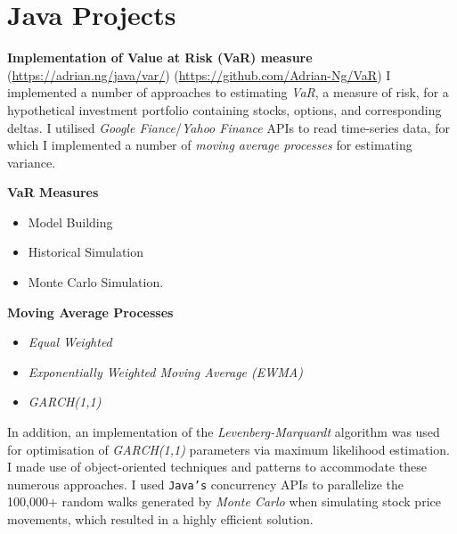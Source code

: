 \documentclass[letterpaper,11pt]{article}
\begin{document}
\section{Java Projects}
\textbf{Implementation of Value at Risk (VaR) measure}
\hfill
\tiny
(\href{https://adrian.ng/java/var/}{https://adrian.ng/java/var/})
\hfill
(\href{https://github.com/Adrian-Ng/VaR}{https://github.com/Adrian-Ng/VaR})
\newline
\small
I implemented a number of approaches to estimating \textit{VaR}, a measure of risk, for a hypothetical investment portfolio containing stocks, options, and corresponding deltas. I utilised \textit{Google Fiance}/\textit{Yahoo Finance} APIs to read time-series data, for which I implemented a number of \textit{moving average processes} for estimating variance.
\begin{multicols}{2}
	\textbf{VaR Measures}
	\begin{itemize}
		\item Model Building
		\item Historical Simulation
		\item Monte Carlo Simulation.
	\end{itemize}
	\columnbreak
	\textbf{Moving Average Processes}
	\begin{itemize}
		\item \textit{Equal Weighted}
		\item \textit{Exponentially Weighted Moving Average (EWMA)}
		\item \textit{GARCH(1,1)}
	\end{itemize}
\end{multicols}
\noindent
In addition, an implementation of the \textit{Levenberg-Marquardt} algorithm was used for optimisation of \textit{GARCH(1,1)} parameters via maximum likelihood estimation.
I made use of object-oriented techniques and patterns to accommodate these numerous approaches.
I used \texttt{Java's} concurrency APIs to parallelize the 100,000+ random walks generated by \textit{Monte Carlo} when simulating stock price movements, which resulted in a highly efficient solution.
\end{document}
